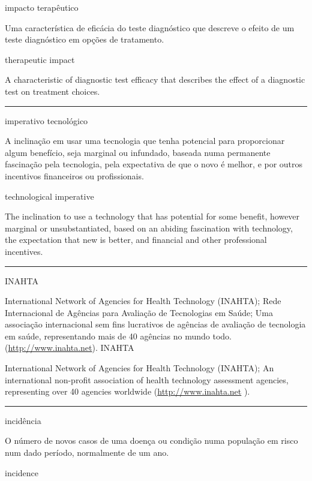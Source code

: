 \documentclass[
]{book}
\begin{document}
impacto terapêutico

Uma característica de eficácia do teste diagnóstico que descreve o efeito de um teste diagnóstico em opções de tratamento.

therapeutic impact

A characteristic of diagnostic test efficacy that describes the effect of a diagnostic test on treatment choices.

\begin{center}\rule{0.5\linewidth}{0.5pt}\end{center}

imperativo tecnológico

A inclinação em usar uma tecnologia que tenha potencial para proporcionar algum benefício, seja marginal ou infundado, baseada numa permanente fascinação pela tecnologia, pela expectativa de que o novo é melhor, e por outros incentivos financeiros ou profissionais.

technological imperative

The inclination to use a technology that has potential for some benefit, however marginal or unsubstantiated, based on an abiding fascination with technology, the expectation that new is better, and financial and other professional incentives.

\begin{center}\rule{0.5\linewidth}{0.5pt}\end{center}

INAHTA

International Network of Agencies for Health Technology (INAHTA); Rede Internacional de Agências para Avaliação de Tecnologias em Saúde; Uma associação internacional sem fins lucrativos de agências de avaliação de tecnologia em saúde, representando mais de 40 agências no mundo todo. (\url{http://www.inahta.net}).
INAHTA

International Network of Agencies for Health Technology (INAHTA); An international non-profit association of health technology assessment agencies, representing over 40 agencies worldwide (\url{http://www.inahta.net} ).

\begin{center}\rule{0.5\linewidth}{0.5pt}\end{center}

incidência

O número de novos casos de uma doença ou condição numa população em risco num dado período, normalmente de um ano.

incidence
\end{document}
